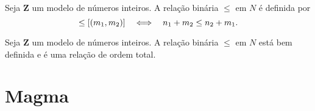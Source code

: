 \begin{definition}
	Seja $\bm Z$ um modelo de números inteiros. A relação binária $\leq$ em $N$ é definida por
	\begin{equation*}
	[(n_1,n_2)] \leq [(m_1,m_2)] \sse n_1+m_2 \leq n_2+m_1.
	\end{equation*}
\end{definition}

\begin{proposition}
	Seja $\bm Z$ um modelo de números inteiros. A relação binária $\leq$ em $N$ está bem definida e é uma relação de ordem total.
\end{proposition}


%
%
%
%
%
%
%
%
%

\section{Magma}

